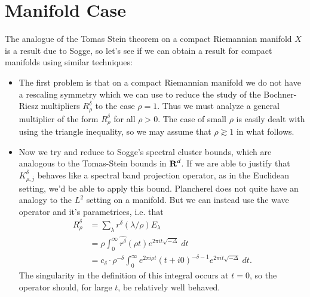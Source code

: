 \section{Manifold Case}

The analogue of the Tomas Stein theorem on a compact Riemannian manifold $X$ is a result due to Sogge, so let's see if we can obtain a result for compact manifolds using similar techniques:
%
\begin{itemize}
    \item The first problem is that on a compact Riemannian manifold we do not have a rescaling symmetry which we can use to reduce the study of the Bochner-Riesz multipliers $R^\delta_\rho$ to the case $\rho = 1$. Thus we must analyze a general multiplier of the form $R^\delta_\rho$ for all $\rho > 0$. The case of small $\rho$ is easily dealt with using the triangle inequality, so we may assume that $\rho \gtrsim 1$ in what follows.

    \item Now we try and reduce to Sogge's spectral cluster bounds, which are analogous to the Tomas-Stein bounds in $\operatorname{\mathbf{R}}^d$. If we are able to justify that $K^\delta_{\rho,j}$ behaves like a spectral band projection operator, as in the Euclidean setting, we'd be able to apply this bound. Plancherel does not quite have an analogy to the $L^2$ setting on a manifold. But we can instead use the wave operator and it's parametrices, i.e. that
    \begin{align*}
        R^\delta_\rho &= \sum_\lambda r^\delta(\lambda / \rho) E_\lambda\\
        &= \rho \int_0^\infty \widehat{r^\delta}(\rho t) e^{2 \pi i t \sqrt{-\Delta}}\; dt\\
        &= c_\delta \cdot \rho^{-\delta} \int_0^\infty e^{2 \pi i \rho t} (t + i0)^{-\delta - 1} e^{2 \pi i t \sqrt{-\Delta}}\; dt.
    \end{align*}
    The singularity in the definition of this integral occurs at $t = 0$, so the operator should, for large $t$, be relatively well behaved.


\end{itemize}

